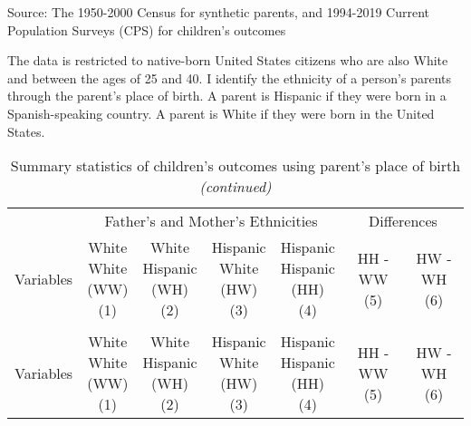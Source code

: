 
\begin{landscape}
\begin{ThreePartTable}
\begin{TableNotes}
\item[1] Source: The 1950-2000 Census for synthetic parents, and 1994-2019 Current Population Surveys (CPS) for children's outcomes
\item[2] The data is restricted to native-born United States citizens who are also White and between the ages of 25 and 40. I identify the ethnicity of a person's parents through the parent's place of birth. A parent is Hispanic if they were born in a Spanish-speaking country. A parent is White if they were born in the United States.
\end{TableNotes}
\begin{longtable}[t]{>{\raggedright\arraybackslash}p{5cm}cccccc}
\caption{Summary statistics of children's outcomes using parent's place of birth \label{tab:c&p1}}\\
\toprule
\multicolumn{1}{c}{ } & \multicolumn{4}{c}{Father's and Mother's Ethnicities} & \multicolumn{2}{c}{Differences} \\
\cmidrule(l{3pt}r{3pt}){2-5} \cmidrule(l{3pt}r{3pt}){6-7}
Variables & \specialcell{White \\ White \\ (WW) \\ (1)} & \specialcell{White \\ Hispanic \\ (WH) \\ (2)} & \specialcell{Hispanic \\ White \\ (HW) \\ (3)} & \specialcell{Hispanic \\ Hispanic \\ (HH) \\ (4)} & \specialcell{HH - WW \\ (5)} & \specialcell{HW - WH \\ (6)}\\
\midrule
\endfirsthead
\caption[]{Summary statistics of children's outcomes using parent's place of birth  \textit{(continued)}}\\
\toprule
Variables & \specialcell{White \\ White \\ (WW) \\ (1)} & \specialcell{White \\ Hispanic \\ (WH) \\ (2)} & \specialcell{Hispanic \\ White \\ (HW) \\ (3)} & \specialcell{Hispanic \\ Hispanic \\ (HH) \\ (4)} & \specialcell{HH - WW \\ (5)} & \specialcell{HW - WH \\ (6)}\\

\end{longtable}
\end{ThreePartTable}
\end{landscape}
